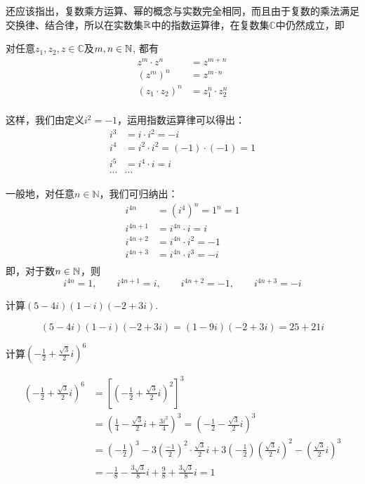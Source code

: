 还应该指出，复数乘方运算、幂的概念与实数完全相同，而且由于复数的乘法满足交换律、结合律，所以在实数集$\mathbb{R}$中的指数运算律，在复数集$\mathbb{C}$中仍然成立，即

对任意$z_1,z_2,z\in\mathbb{C}$及$m,n\in\mathbb{N}$, 都有
\[\begin{split}
    z^m\cdot z^n&=z^{m+n}\\
    (z^m)^n&=z^{m\cdot n}\\
    (z_1\cdot z_2)^n&=z^{n}_1\cdot z^{n}_2\\
\end{split}\]

这样，我们由定义$i^2=-1$，运用指数运算律可以得出：
\[\begin{split}
i^3&=i\cdot i^2=-i\\
i^4&=i^2\cdot i^2=(-1)\cdot (-1)=1\\
i^5&=i^4\cdot i=i\\
\cdots&\cdots
\end{split}\]

一般地，对任意$n\in\mathbb{N}$，我们可归纳出：
\[\begin{split}
    i^{4n}&=(i^4)^n=1^n=1\\
    i^{4n+1}&=i^{4n}\cdot i=i\\
    i^{4n+2}&=i^{4n}\cdot i^2=-1\\
    i^{4n+3}&=i^{4n}\cdot i^3=-i\\
\end{split}\]
即，对于数$n\in\mathbb{N}$，则
\[i^{4n}=1,\qquad i^{4n+1}=i,\qquad i^{4n+2}=-1,\qquad i^{4n+3}=-i\]

\begin{example}
    计算$(5-4i)(1-i)(-2+3i)$.
\end{example}

\begin{solution}
\[(5-4i)(1-i)(-2+3i)=(1- 9i) (- 2+ 3i) = 25+ 21i\]
\end{solution}

\begin{example}
    计算$\left(-\frac12+\frac{\sqrt{3}}{2}i\right)^6$
\end{example}

\begin{solution}
\[\begin{split}
    \left(-\frac12+\frac{\sqrt{3}}{2}i\right)^6&=\left[\left(-\frac12+\frac{\sqrt{3}}{2}i\right)^2\right]^3\\
&= \left(\frac{1}{4}-\frac{\sqrt{3}}{2}i+\frac{3i^{2}}{4}\right)^{3}=\left(-\frac{1}{2}-\frac{\sqrt{3}}{2}i\right)^3\\
&=\left( - \frac 12\right) ^{3}- 3\left( \frac {- 1}{2}\right)^{2}\cdot \frac {\sqrt {3}}2i+3\left(-\frac{1}{2}\right)\left(\frac{\sqrt{3}}{2}i\right)^{2}-\left(\frac{\sqrt{3}}{2}i\right)^{3}\\
&=-\frac{1}{8}-\frac{3\sqrt{3}}{8}i+\frac{9}{8}+\frac{3\sqrt{3}}{8}i=1
\end{split}\]
\end{solution}


